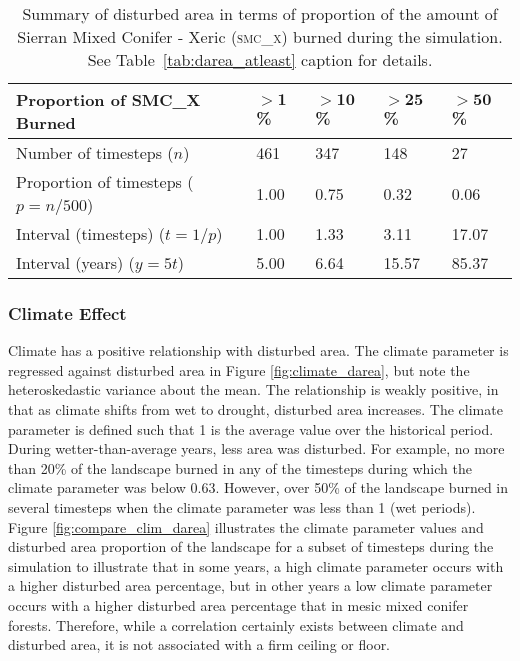 \begin{table}[!htbp]
\footnotesize
\centering
\caption{Summary of disturbed area in terms of proportion of the amount of Sierran Mixed Conifer - Xeric (\textsc{smc\_x}) burned during the simulation. See Table~\ref{tab:darea_atleast} caption for details.}
\label{tab:darea_atleast_smcx}
\begin{tabular}{@{}lllll@{}}
 \toprule
\textbf{Proportion of SMC\_X Burned} & \textbf{$\mathbf{>1}$\%}     & \textbf{$\mathbf{>10}$\%}    & \textbf{$\mathbf{>25}$\%}    & \textbf{$\mathbf{>50}$\%} \\ \midrule
Number of timesteps ($n$)             & 461          & 347           & 148           & 27            \\
Proportion of timesteps ($p = n/500$) & 1.00         & 0.75          & 0.32          & 0.06          \\
Interval (timesteps) ($t = 1/p$)      & 1.00         & 1.33          & 3.11          & 17.07         \\
Interval (years)    ($y = 5t$)        & 5.00         & 6.64          & 15.57         & 85.37         \\ \bottomrule
\end{tabular}
\end{table}


\subsubsection{Climate Effect} 
Climate has a positive relationship with disturbed area. The climate parameter is regressed against disturbed area in Figure \ref{fig:climate_darea}, but note the heteroskedastic variance about the mean. The relationship is weakly positive, in that as climate shifts from wet to drought, disturbed area increases. The climate parameter is defined such that 1 is the average value over the historical period. During wetter-than-average years, less area was disturbed. For example, no more than 20\% of the landscape burned in any of the timesteps during which the climate parameter was below 0.63. However, over 50\% of the landscape burned in several timesteps when the climate parameter was less than 1 (wet periods). Figure \ref{fig:compare_clim_darea} illustrates the climate parameter values and disturbed area proportion of the landscape for a subset of timesteps during the simulation to illustrate that in some years, a high climate parameter occurs with a higher disturbed area percentage, but in other years a low climate parameter occurs with a higher disturbed area percentage that in mesic mixed conifer forests. Therefore, while a correlation certainly exists between climate and disturbed area, it is not associated with a firm ceiling or floor.

